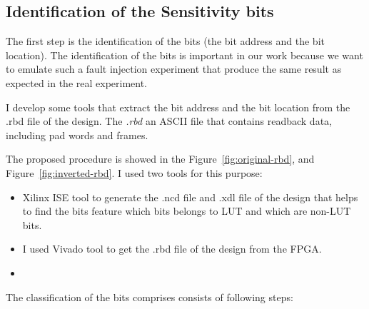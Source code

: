 \subsection{Identification of the Sensitivity bits}
\label{SE-bits}

The first step is the identification of the bits (the bit address and the bit location). The identification of the bits is important in our work because we want to emulate such a fault injection experiment that produce the same result as expected in the real experiment.

I develop some tools that extract the bit address and the bit location from the .rbd file of the design. The \textit{.rbd} an ASCII file that contains readback data, including pad words and frames.

The proposed procedure is showed in the Figure~\ref{fig:original-rbd}, and Figure~\ref{fig:inverted-rbd}.  I used two tools for this purpose: 

\begin{itemize}

\item Xilinx ISE tool to generate the .ncd file and .xdl file of the design that helps to find the bits feature which bits belongs to LUT and which are non-LUT bits.

\item I used Vivado tool to get the .rbd file of the design from the FPGA.


\item 
\end{itemize}


The classification of the bits comprises consists of following steps:

